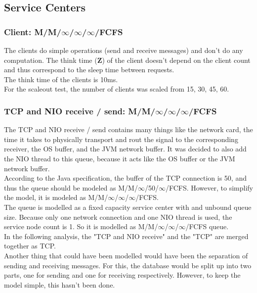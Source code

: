 \documentclass[a4paper]{article}
\begin{document}
\subsection{Service Centers}

\subsubsection{Client: M/M/$\infty$/$\infty$/$\infty$/FCFS}

The clients do simple operations (send and receive messages) and don't do any computation. The think time (\textbf{Z}) of the client doesn't depend on the client count and thus correspond to the sleep time between requests.\\

The think time of the clients is 10ms.\\

For the scaleout test, the number of clients was scaled from 15, 30, 45, 60.

\subsubsection{TCP and NIO receive / send: M/M/$\infty$/$\infty$/$\infty$/FCFS}

The TCP and NIO receive / send contains many things like the network card, the time it takes to physically transport and rout the signal to the corresponding receiver, the OS buffer, and the JVM network buffer. It was decided to also add the NIO thread to this queue, because it acts like the OS buffer or the JVM network buffer.\\

According to the Java specification, the buffer of the TCP connection is 50, and thus the queue should be modeled as M/M/$\infty$/50/$\infty$/FCFS. However, to simplify the model, it is modeled as M/M/$\infty$/$\infty$/$\infty$/FCFS.\\

The queue is modelled as a fixed capacity service center with and unbound queue size. Because only one network connection and one NIO thread is used, the service node count is 1. So it is modelled as M/M/$\infty$/$\infty$/$\infty$/FCFS queue.\\

In the following analysis, the "TCP and NIO receive" and the "TCP" are merged together as TCP.\\

Another thing that could have been modelled would have been the separation of sending and receiving messages. For this, the database would be split up into two parts, one for sending and one for receiving respectively. However, to keep the model simple, this hasn't been done.\\
\end{document}
